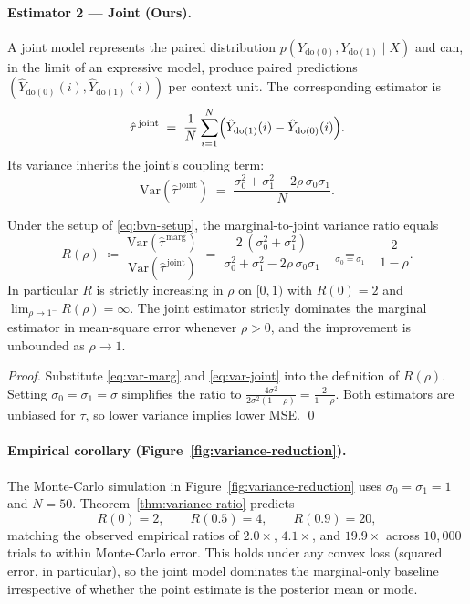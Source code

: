 \paragraph{Estimator 2 --- Joint (Ours).}
A joint model represents the paired distribution
$p(Y_{\mathrm{do}(0)}, Y_{\mathrm{do}(1)} \mid X)$ and can, in the limit of an
expressive model, produce paired predictions
$(\hat{Y}_{\mathrm{do}(0)}(i), \hat{Y}_{\mathrm{do}(1)}(i))$
per context unit. The corresponding estimator is
\begin{equation}
\hat{\tau}^{\,\mathrm{joint}}
\;=\;
\frac{1}{N}\sum_{i=1}^{N}
\Bigl(\hat{Y}_{\mathrm{do}(1)}(i) - \hat{Y}_{\mathrm{do}(0)}(i)\Bigr).
\end{equation}
Its variance inherits the joint's coupling term:
\begin{equation}
\mathrm{Var}\!\left(\hat{\tau}^{\,\mathrm{joint}}\right)
\;=\;
\frac{\sigma_0^2 + \sigma_1^2 - 2\rho\,\sigma_0\sigma_1}{N}.
\label{eq:var-joint}
\end{equation}

\begin{theorem}
\label{thm:variance-ratio}
Under the setup of \eqref{eq:bvn-setup}, the marginal-to-joint variance
ratio equals
\begin{equation}
R(\rho) \;\coloneqq\;
\frac{\mathrm{Var}\!\left(\hat{\tau}^{\,\mathrm{marg}}\right)}
{\mathrm{Var}\!\left(\hat{\tau}^{\,\mathrm{joint}}\right)}
\;=\;
\frac{2\,(\sigma_0^2 + \sigma_1^2)}{\sigma_0^2 + \sigma_1^2 - 2\rho\,\sigma_0\sigma_1}
\;\;\;\underset{\sigma_0=\sigma_1}{=}\;\;\;
\frac{2}{1-\rho}.
\label{eq:ratio}
\end{equation}
In particular $R$ is strictly increasing in $\rho$ on $[0,1)$ with
$R(0)=2$ and $\lim_{\rho\to 1^-}R(\rho)=\infty$.
The joint estimator strictly dominates the marginal estimator in
mean-square error whenever $\rho > 0$, and the improvement is unbounded as
$\rho \to 1$.
\end{theorem}

\begin{proof}
Substitute \eqref{eq:var-marg} and \eqref{eq:var-joint} into the definition
of $R(\rho)$. Setting $\sigma_0 = \sigma_1 = \sigma$ simplifies the ratio
to $\frac{4\sigma^2}{2\sigma^2(1-\rho)}=\frac{2}{1-\rho}$.
Both estimators are unbiased for $\tau$, so lower variance implies lower MSE.
\qed
\end{proof}

\paragraph{Empirical corollary (Figure~\ref{fig:variance-reduction}).}
The Monte-Carlo simulation in Figure~\ref{fig:variance-reduction} uses
$\sigma_0=\sigma_1=1$ and $N=50$. Theorem~\ref{thm:variance-ratio} predicts
\[
R(0) = 2, \qquad R(0.5) = 4, \qquad R(0.9) = 20,
\]
matching the observed empirical ratios of $2.0\times$, $4.1\times$, and
$19.9\times$ across $10{,}000$ trials to within Monte-Carlo error. This
holds under any convex loss (squared error, in particular), so the joint
model dominates the marginal-only baseline irrespective of whether the
point estimate is the posterior mean or mode.
